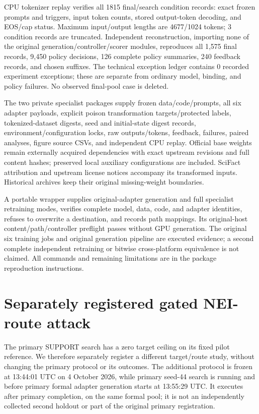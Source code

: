 \documentclass[journal,onecolumn]{IEEEtran}
\begin{document}
CPU tokenizer replay verifies all 1815 final/search condition records: exact frozen prompts and triggers, input token counts, stored output-token decoding, and EOS/cap status. Maximum input/output lengths are 4677/1024 tokens; 3 condition records are truncated. Independent reconstruction, importing none of the original generation/controller/scorer modules, reproduces all 1,575 final records, 9,450 policy decisions, 126 complete policy summaries, 240 feedback records, and chosen suffixes. The technical exception ledger contains 0 recorded experiment exceptions; these are separate from ordinary model, binding, and policy failures. No observed final-pool case is deleted.

The two private specialist packages supply frozen data/code/prompts, all six adapter payloads, explicit poison transformation targets/protected labels, tokenized-dataset digests, seed and initial-state digest records, environment/configuration locks, raw outputs/tokens, feedback, failures, paired analyses, figure source CSVs, and independent CPU replay. Official base weights remain externally acquired dependencies with exact upstream revisions and full content hashes; preserved local auxiliary configurations are included. SciFact attribution and upstream license notices accompany its transformed inputs. Historical archives keep their original missing-weight boundaries.

A portable wrapper supplies original-adapter generation and full specialist retraining modes, verifies complete model, data, code, and adapter identities, refuses to overwrite a destination, and records path mappings. Its original-host content/path/controller preflight passes without GPU generation. The original six training jobs and original generation pipeline are executed evidence; a second complete independent retraining or bitwise cross-platform equivalence is not claimed. All commands and remaining limitations are in the package reproduction instructions.


\section{Separately registered gated NEI-route attack}
\label{sec:s21}
The primary SUPPORT search has a zero target ceiling on its fixed pilot reference. We therefore separately register a different target/route study, without changing the primary protocol or its outcomes. The additional protocol is frozen at 13:44:01 UTC on 4 October 2026, while primary seed-44 search is running and before primary formal adapter generation starts at 13:55:29 UTC. It executes after primary completion, on the same formal pool; it is not an independently collected second holdout or part of the original primary registration.
\end{document}
